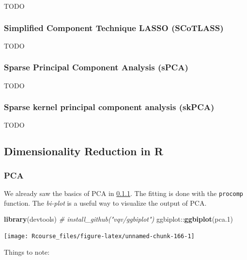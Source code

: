 \documentclass[]{book}
\newenvironment{Shaded}{\begin{snugshade}}{\end{snugshade}}
\newcommand{\KeywordTok}[1]{\textcolor[rgb]{0.13,0.29,0.53}{\textbf{{#1}}}}
\newcommand{\FloatTok}[1]{\textcolor[rgb]{0.00,0.00,0.81}{{#1}}}
\newcommand{\CommentTok}[1]{\textcolor[rgb]{0.56,0.35,0.01}{\textit{{#1}}}}
\newcommand{\NormalTok}[1]{{#1}}
\theoremstyle{definition}
\theoremstyle{definition}
\theoremstyle{remark}
\begin{document}
TODO

\subsubsection{Simplified Component Technique LASSO
(SCoTLASS)}\label{simplified-component-technique-lasso-scotlass}

TODO

\subsubsection{Sparse Principal Component Analysis
(sPCA)}\label{sparse-principal-component-analysis-spca}

TODO

\subsubsection{Sparse kernel principal component analysis
(skPCA)}\label{sparse-kernel-principal-component-analysis-skpca}

TODO

\subsection{Dimensionality Reduction in
R}\label{dimensionality-reduction-in-r}

\subsubsection{PCA}\label{pca}

We already saw the basics of PCA in \ref{pca}. The fitting is done with
the \texttt{procomp} function. The \emph{bi-plot} is a useful way to
visualize the output of PCA.

\begin{Shaded}
\begin{Highlighting}[]
\KeywordTok{library}\NormalTok{(devtools)}
\CommentTok{# install_github("vqv/ggbiplot")}
\NormalTok{ggbiplot::}\KeywordTok{ggbiplot}\NormalTok{(pca}\FloatTok{.1}\NormalTok{) }
\end{Highlighting}
\end{Shaded}

\texttt{[image: Rcourse\_files/figure-latex/unnamed-chunk-166-1]}

Things to note:
\end{document}
